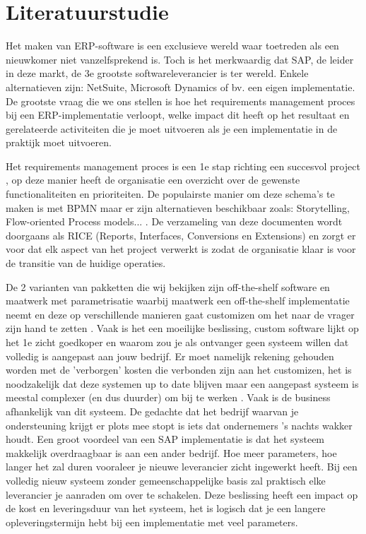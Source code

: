 
\chapter{Literatuurstudie}
\label{ch:literatuurstudie}

Het maken van ERP-software is een exclusieve wereld waar toetreden als een nieuwkomer niet vanzelfsprekend is. Toch is het merkwaardig dat SAP, de leider in deze markt, de 3e grootste softwareleverancier is ter wereld. Enkele alternatieven zijn: NetSuite, Microsoft Dynamics of bv. een eigen implementatie.
De grootste vraag die we ons stellen is hoe het requirements management proces bij een ERP-implementatie verloopt, welke impact dit heeft op het resultaat en gerelateerde activiteiten die je moet uitvoeren als je een implementatie in de praktijk moet uitvoeren. 

Het requirements management proces is een 1e stap richting een succesvol project \autocite{Williamson2018}, op deze manier heeft de organisatie een overzicht over de gewenste functionaliteiten en prioriteiten. De populairste manier om deze schema's te maken is met BPMN maar er zijn alternatieven beschikbaar zoals: Storytelling, Flow-oriented Process models... \autocite{Lillehagen2009}. De verzameling van deze documenten wordt doorgaans als RICE (Reports, Interfaces, Conversions en Extensions) \autocite{Williamson2018} en zorgt er voor dat elk aspect van het project verwerkt is zodat de organisatie klaar is voor de transitie van de huidige operaties. 

De 2 varianten van pakketten die wij bekijken zijn off-the-shelf software en maatwerk met parametrisatie waarbij maatwerk een off-the-shelf implementatie neemt en deze op verschillende manieren gaat customizen om het naar de vrager zijn hand te zetten \autocite{Vollmer2016}. Vaak is het een moeilijke beslissing, custom software lijkt op het 1e zicht goedkoper en waarom zou je als ontvanger geen systeem willen dat volledig is aangepast aan jouw bedrijf. Er moet namelijk rekening gehouden worden met de 'verborgen' kosten die verbonden zijn aan het customizen, het is noodzakelijk dat deze systemen up to date blijven maar een aangepast systeem is meestal complexer (en dus duurder) om bij te werken \autocite{Bdc2019}. Vaak is de business afhankelijk van dit systeem. De gedachte dat het bedrijf waarvan je ondersteuning krijgt er plots mee stopt is iets dat ondernemers 's nachts wakker houdt. Een groot voordeel van een SAP implementatie is dat het systeem makkelijk overdraagbaar is aan een ander bedrijf. Hoe meer parameters, hoe langer het zal duren vooraleer je nieuwe leverancier zicht ingewerkt heeft. Bij een volledig nieuw systeem zonder gemeenschappelijke basis zal praktisch elke leverancier je aanraden om over te schakelen. Deze beslissing heeft een impact op de kost en leveringsduur van het systeem, het is logisch dat je een langere opleveringstermijn hebt bij een implementatie met veel parameters.


